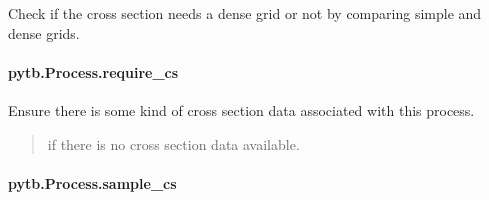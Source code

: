 \documentclass[letterpaper,10pt,english,openany,oneside]{sphinxmanual}
\begin{document}
\begin{fulllineitems}
\begin{fulllineitems}
\label{\detokenize{api/pytb.Process.auto_sample:pytb.Process.auto_sample}}
\pysigstartsignatures
{}
\pysigstopsignatures
\sphinxAtStartPar
Check if the cross section needs a dense grid or not by comparing
simple and dense grids.

\end{fulllineitems}


\sphinxstepscope


\paragraph{pytb.Process.require\_cs}
\label{\detokenize{api/pytb.Process.require_cs:pytb-process-require-cs}}\label{\detokenize{api/pytb.Process.require_cs::doc}}

\begin{fulllineitems}
\label{\detokenize{api/pytb.Process.require_cs:pytb.Process.require_cs}}
\pysigstartsignatures
{}
\pysigstopsignatures
\sphinxAtStartPar
Ensure there is some kind of cross section data associated with this
process.
\begin{quote}\begin{description}
\sphinxAtStartPar
{} \textendash{} if there is no cross section data available.

\end{description}\end{quote}

\end{fulllineitems}


\sphinxstepscope


\paragraph{pytb.Process.sample\_cs}
\label{\detokenize{api/pytb.Process.sample_cs:pytb-process-sample-cs}}\label{\detokenize{api/pytb.Process.sample_cs::doc}}


\end{fulllineitems}
\end{document}
